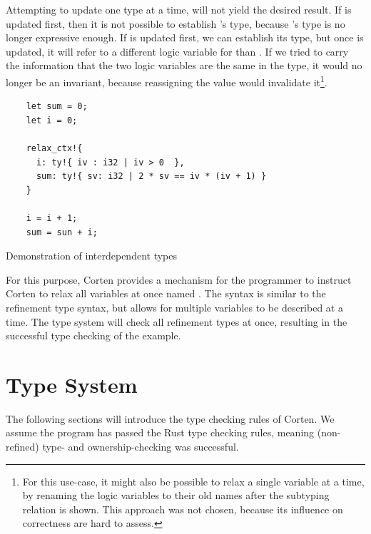 \documentclass[twoside, english]{sdqthesis}
\theoremstyle{definition}
\begin{document}
Attempting to update one type at a time, will not yield the desired result. If  is updated first, then it is not possible to establish 's type, because 's type is no longer expressive enough.
If  is updated first, we can establish its type, but once  is updated, it will refer to a different logic variable for  than . If we tried to carry the information that the two logic variables are the same in the type, it would no longer be an invariant, because reassigning the value would invalidate it\footnote{
  For this use-case, it might also be possible to relax a single variable at a time, by renaming the logic variables to their old names after the subtyping relation is shown. This approach was not chosen, because its influence on correctness are hard to assess.
}.

\begin{listing}[ht]
  \begin{verbatim}
    let sum = 0;
    let i = 0;
    
    relax_ctx!{
      i: ty!{ iv : i32 | iv > 0  },
      sum: ty!{ sv: i32 | 2 * sv == iv * (iv + 1) }
    }

    i = i + 1;
    sum = sun + i;

  \end{verbatim}
  \caption{Demonstration of interdependent types}
  \label{lst:mutual-reference}
\end{listing}

For this purpose, Corten provides a mechanism for the programmer to instruct Corten to relax all variables at once \- named . The syntax is similar to the refinement type syntax, but allows for multiple variables to be described at a time. The type system will check all refinement types at once, resulting in the successful type checking of the example.

\section{Type System} \label{sec:type-system}

The following sections will introduce the type checking rules of Corten. We assume the program has passed the Rust type checking rules, meaning (non-refined) type- and ownership-checking was successful.
\end{document}
